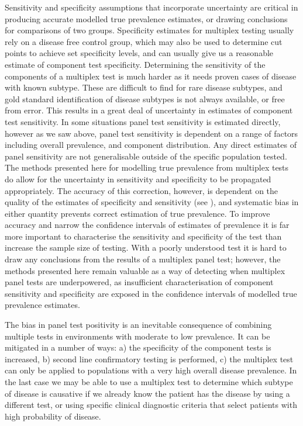 \documentclass[10pt,letterpaper]{article}
\begin{document}
Sensitivity and specificity assumptions that incorporate uncertainty are critical in producing accurate modelled true prevalence estimates, or drawing conclusions for comparisons of two groups. Specificity estimates for multiplex testing usually rely on a disease free control group, which may also be used to determine cut points to achieve set specificity levels, and can usually give us a reasonable estimate of component test specificity. Determining the sensitivity of the components of a multiplex test is much harder as it needs proven cases of disease with known subtype. These are difficult to find for rare disease subtypes, and gold standard identification of disease subtypes is not always available, or free from error\cite{loeffelholz2020,leber2018}. This results in a great deal of uncertainty in estimates of component test sensitivity. In some situations panel test sensitivity is estimated directly, however as we saw above, panel test sensitivity is dependent on a range of factors including overall prevalence, and component distribution. Any direct estimates of panel sensitivity are not generalisable outside of the specific population tested. The methods presented here for modelling true prevalence from multiplex tests do allow for the uncertainty in sensitivity and specificity to be propagated appropriately. The accuracy of this correction, however, is dependent on the quality of the estimates of specificity and sensitivity (see ), and systematic bias in either quantity prevents correct estimation of true prevalence. To improve accuracy and narrow the confidence intervals of estimates of prevalence it is far more important to characterise the sensitivity and specificity of the test than increase the sample size of testing. With a poorly understood test it is hard to draw any conclusions from the results of a multiplex panel test; however, the methods presented here remain valuable as a way of detecting when multiplex panel tests are underpowered, as insufficient characterisation of component sensitivity and specificity are exposed in the confidence intervals of modelled true prevalence estimates.

The bias in panel test positivity is an inevitable consequence of combining multiple tests in environments with moderate to low prevalence. It can be mitigated in a number of ways: a) the specificity of the component tests is increased, b) second line confirmatory testing is performed, c) the multiplex test can only be applied to populations with a very high overall disease prevalence. In the last case we may be able to use a multiplex test to determine which subtype of disease is causative if we already know the patient has the disease by using a different test, or using specific clinical diagnostic criteria that select patients with high probability of disease.
\end{document}
